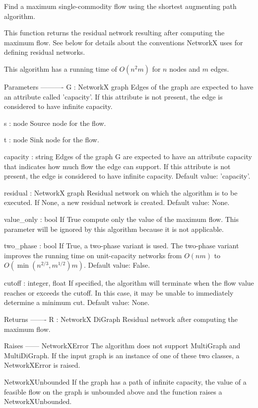 \begin{DoxyVerb}Find a maximum single-commodity flow using the shortest augmenting path
algorithm.

This function returns the residual network resulting after computing
the maximum flow. See below for details about the conventions
NetworkX uses for defining residual networks.

This algorithm has a running time of $O(n^2 m)$ for $n$ nodes and $m$
edges.


Parameters
----------
G : NetworkX graph
    Edges of the graph are expected to have an attribute called
    'capacity'. If this attribute is not present, the edge is
    considered to have infinite capacity.

s : node
    Source node for the flow.

t : node
    Sink node for the flow.

capacity : string
    Edges of the graph G are expected to have an attribute capacity
    that indicates how much flow the edge can support. If this
    attribute is not present, the edge is considered to have
    infinite capacity. Default value: 'capacity'.

residual : NetworkX graph
    Residual network on which the algorithm is to be executed. If None, a
    new residual network is created. Default value: None.

value_only : bool
    If True compute only the value of the maximum flow. This parameter
    will be ignored by this algorithm because it is not applicable.

two_phase : bool
    If True, a two-phase variant is used. The two-phase variant improves
    the running time on unit-capacity networks from $O(nm)$ to
    $O(\min(n^{2/3}, m^{1/2}) m)$. Default value: False.

cutoff : integer, float
    If specified, the algorithm will terminate when the flow value reaches
    or exceeds the cutoff. In this case, it may be unable to immediately
    determine a minimum cut. Default value: None.

Returns
-------
R : NetworkX DiGraph
    Residual network after computing the maximum flow.

Raises
------
NetworkXError
    The algorithm does not support MultiGraph and MultiDiGraph. If
    the input graph is an instance of one of these two classes, a
    NetworkXError is raised.

NetworkXUnbounded
    If the graph has a path of infinite capacity, the value of a
    feasible flow on the graph is unbounded above and the function
    raises a NetworkXUnbounded.


\end{DoxyVerb}
